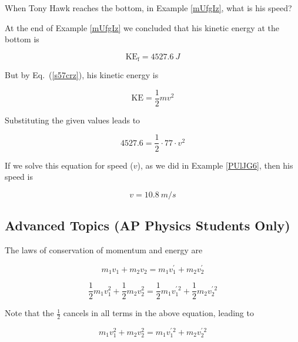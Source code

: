 \documentclass[main.tex]{subfiles}
\begin{document}
\cyanhrule

\begin{example} \label{nQVUKM}
    When Tony Hawk reaches the bottom, in Example \ref{mUfgIz}, what is his speed?
\end{example}

\Solution At the end of Example \ref{mUfgIz} we concluded that his kinetic energy at the bottom is 

\begin{equation*}
    \mathrm{KE_f} = \SI{4527.6}{J}
\end{equation*}

But by Eq.~(\ref{s57crz}), his kinetic energy is

\begin{equation*}
    \mathrm{KE} = \frac{1}{2} m v^2
\end{equation*}

Substituting the given values leads to 

\begin{equation*}
    4527.6 = \frac{1}{2} \cdot 77 \cdot v^2
\end{equation*}

If we solve this equation for speed ($v$), as we did in Example \ref{PUlJG6}, then his speed is

\begin{equation*}
    v = \SI{10.8}{m/s}
\end{equation*}

\cyanhrule


\subsection{Advanced Topics (AP Physics Students Only)} 

The laws of conservation of momentum and energy are

\begin{equation} \label{EFyWT6}
    m_1 v_1 + m_2 v_2 = m_1 v_1^{\prime} + m_2 v_2^{\prime}
\end{equation}

\begin{equation*}
    \frac{1}{2} m_1 v_1^2 + \frac{1}{2} m_2 v_2^2 = \frac{1}{2} m_1 v_1^{\prime\,2} + \frac{1}{2} m_2 v_2^{\prime\,2}
\end{equation*}

Note that the $\frac{1}{2}$ cancels in all terms in the above equation, leading to

\begin{equation} \label{jPL9Aw}
    m_1 v_1^2 + m_2 v_2^2 = m_1 v_1^{\prime\,2} + m_2 v_2^{\prime\,2}
\end{equation}
\end{document}
